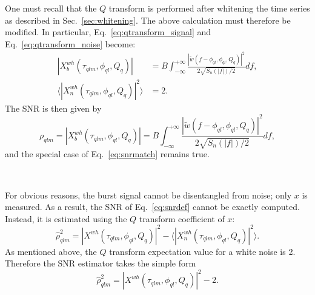 \documentclass[aps]{revtex4-1}
\begin{document}
One must recall that the $Q$ transform is performed after whitening the time series as described in Sec.~\ref{sec:whitening}. The above calculation must therefore be modified. In particular, Eq.~\ref{eq:qtransform_signal} and Eq.~\ref{eq:qtransform_noise} become:
\begin{align}
  |X^{wh}_b(\tau_{qlm}, \phi_{ql}, Q_q)| &= B \int_{-\infty}^{+\infty}{\frac{|\tilde{w}(f-\phi_{ql},\phi_{ql},Q_q)|^2}{2\sqrt{S_n(|f|)/2}}df}, \\
  \langle |X^{wh}_n(\tau_{qlm}, \phi_{ql}, Q_q)|^2 \rangle &= 2.
  \label{eq:qtransform_whitened}
\end{align}
The SNR is then given by
\begin{equation}
  \rho_{qlm} = |X^{wh}_b(\tau_{qlm}, \phi_{ql}, Q_q)| = B \int_{-\infty}^{+\infty}{\frac{|\tilde{w}(f-\phi_{ql},\phi_{ql},Q_q)|^2}{2\sqrt{S_n(|f|)/2}}df},
  \label{eq:snr_white}
\end{equation}
and the special case of Eq.~\ref{eq:snrmatch} remains true.

~

For obvious reasons, the burst signal cannot be disentangled from noise; only $x$ is measured. As a result, the SNR of Eq.~\ref{eq:snrdef} cannot be exactly computed. Instead, it is estimated using the $Q$ transform coefficient of $x$:
\begin{equation}
  \hat{\rho}_{qlm}^2 =  |X^{wh}(\tau_{qlm}, \phi_{ql}, Q_q)|^2 - \langle |X^{wh}_n(\tau_{qlm}, \phi_{ql}, Q_q)|^2 \rangle .
\end{equation}
As mentioned above, the $Q$ transform expectation value for a white noise is 2. Therefore the SNR estimator takes the simple form
\begin{equation}
  \hat{\rho}_{qlm}^2 =  |X^{wh}(\tau_{qlm}, \phi_{ql}, Q_q)|^2 - 2 . \label{eq:snrestimator}
\end{equation}
\end{document}
